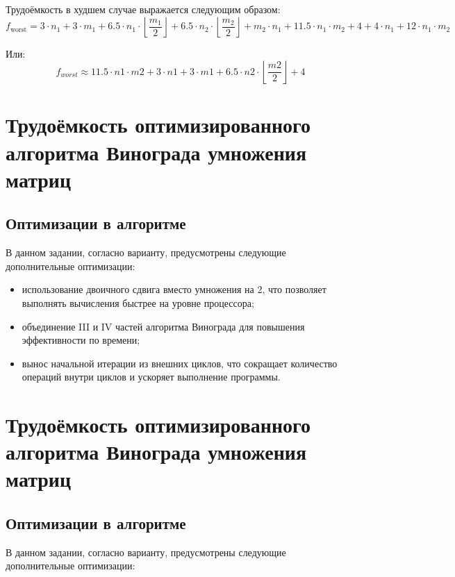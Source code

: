 \documentclass[a4paper, 12pt]{extreport}
\begin{document}
Трудоёмкость в худшем случае выражается следующим образом:
\begin{equation}
f_{\text{worst}} = 3 \cdot n_1 + 3 \cdot m_1 + 6.5 \cdot n_1 \cdot \left\lfloor \frac{m_1}{2} \right\rfloor + 6.5 \cdot n_2 \cdot \left\lfloor \frac{m_2}{2} \right\rfloor 
+ m_2 \cdot n_1 + 11.5 \cdot n_1 \cdot m_2 + 4 + 4 \cdot n_1 + 12 \cdot n_1 \cdot m_2
\end{equation}

Или:
\begin{equation}
f_{worst} \approx 11.5 \cdot n1 \cdot m2 + 3 \cdot n1 + 3 \cdot m1 + 6.5 \cdot n2 \cdot \left\lfloor \frac{m2}{2} \right\rfloor + 4
\end{equation}

\section{Трудоёмкость оптимизированного алгоритма Винограда умножения матриц}

\subsection{Оптимизации в алгоритме}
В данном задании, согласно варианту, предусмотрены следующие дополнительные оптимизации:

\begin{itemize}
    \item[--] использование двоичного сдвига вместо умножения на 2, что позволяет выполнять вычисления быстрее на уровне процессора;
    \item[--] объединение III и IV частей алгоритма Винограда для повышения эффективности по времени;
    \item[--] вынос начальной итерации из внешних циклов, что сокращает количество операций внутри циклов и ускоряет выполнение программы.
\end{itemize}

\section{Трудоёмкость оптимизированного алгоритма Винограда умножения матриц}

\subsection{Оптимизации в алгоритме}
В данном задании, согласно варианту, предусмотрены следующие дополнительные оптимизации:
\end{document}
